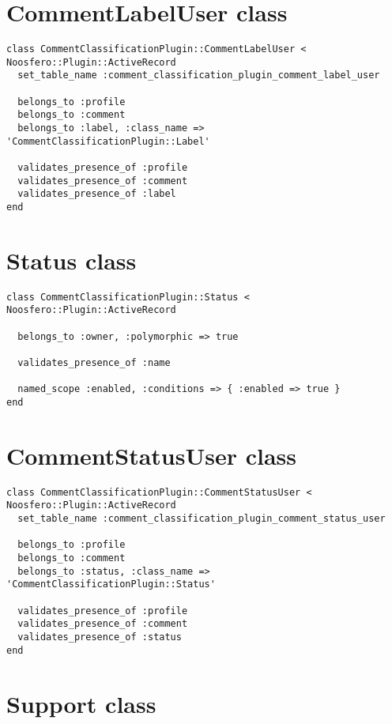 \newpage
\section{CommentLabelUser class} \label{App:PluginCommentLabelUser}

\begin{lstlisting}[style=codeFrame]
class CommentClassificationPlugin::CommentLabelUser <
Noosfero::Plugin::ActiveRecord
  set_table_name :comment_classification_plugin_comment_label_user

  belongs_to :profile
  belongs_to :comment
  belongs_to :label, :class_name => 'CommentClassificationPlugin::Label'

  validates_presence_of :profile
  validates_presence_of :comment
  validates_presence_of :label
end
\end{lstlisting}

\newpage
\section{Status class} \label{App:PluginStatus}

\begin{lstlisting}[style=codeFrame]
class CommentClassificationPlugin::Status <
Noosfero::Plugin::ActiveRecord

  belongs_to :owner, :polymorphic => true

  validates_presence_of :name

  named_scope :enabled, :conditions => { :enabled => true }
end
\end{lstlisting}

\newpage
\section{CommentStatusUser class} \label{App:PluginCommentStatusUser}

\begin{lstlisting}[style=codeFrame]
class CommentClassificationPlugin::CommentStatusUser <
Noosfero::Plugin::ActiveRecord
  set_table_name :comment_classification_plugin_comment_status_user

  belongs_to :profile
  belongs_to :comment
  belongs_to :status, :class_name =>
'CommentClassificationPlugin::Status'

  validates_presence_of :profile
  validates_presence_of :comment
  validates_presence_of :status
end
\end{lstlisting}

\newpage
\section{Support class} \label{App:PluginSupport}

